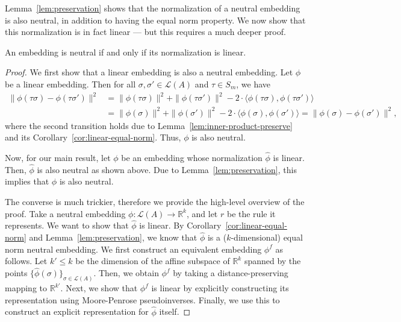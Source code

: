 \documentclass[prodmode,acmec]{ec-acmsmall}
\newcommand{\calL}{{\mathcal{L}}}
\newcommand{\rank}{{\calL(A)}}
\begin{document}
Lemma~\ref{lem:preservation} shows that the normalization of a neutral embedding is also neutral, in addition to having the equal norm property. We now show that this normalization is in fact linear --- but this requires a much deeper proof. 

\begin{theorem}
An embedding is neutral if and only if its normalization is linear. 
\label{thm:neutral-linear}
\end{theorem}
\begin{proof}
We first show that a linear embedding is also a neutral embedding. Let $\phi$ be a linear embedding. Then for all $\sigma,\sigma' \in \rank$ and $\tau \in S_m$, we have
\begin{align*}
\|\phi(\tau \sigma)-\phi(\tau \sigma')\|^2 &= \|\phi(\tau \sigma)\|^2 + \|\phi(\tau \sigma')\|^2 - 2\cdot \langle \phi(\tau \sigma), \phi(\tau \sigma') \rangle \\
&= \|\phi(\sigma)\|^2 + \|\phi(\sigma')\|^2 - 2\cdot \langle \phi(\sigma), \phi(\sigma') \rangle = \|\phi(\sigma)-\phi(\sigma')\|^2,
\end{align*}
where the second transition holds due to Lemma~\ref{lem:inner-product-preserve} and its Corollary~\ref{cor:linear-equal-norm}. Thus, $\phi$ is also neutral. 

Now, for our main result, let $\phi$ be an embedding whose normalization $\hat{\phi}$ is linear. Then, $\hat{\phi}$ is also neutral as shown above. Due to Lemma~\ref{lem:preservation}, this implies that $\phi$ is also neutral.

The converse is much trickier, therefore we provide the high-level overview of the proof. Take a neutral embedding $\phi : \rank \rightarrow \mathbb{R}^k$, and let $r$ be the rule it represents. We want to show that $\hat{\phi}$ is linear. By Corollary~\ref{cor:linear-equal-norm} and Lemma~\ref{lem:preservation}, we know that $\hat{\phi}$ is a ($k$-dimensional) equal norm neutral embedding. We first construct an equivalent embedding $\phi^f$ as follows. Let $k' \le k$ be the dimension of the affine subspace of $\mathbb{R}^k$ spanned by the points $\{\hat{\phi}(\sigma)\}_{\sigma \in \rank}$. Then, we obtain $\phi^f$ by taking a distance-preserving mapping to $\mathbb{R}^{k'}$. Next, we show that $\phi^f$ is linear by explicitly constructing its representation using Moore-Penrose pseudoinverses. Finally, we use this to construct an explicit representation for $\hat{\phi}$ itself. 


\end{proof}
\end{document}
